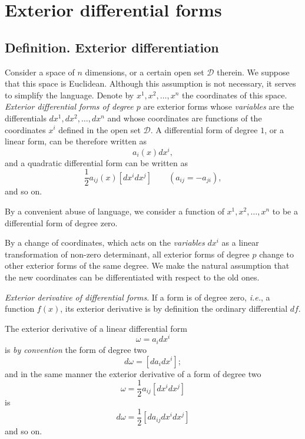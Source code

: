 \chapter{Exterior differential forms}
\label{cha:exter-diff-forms}

\section{Definition. Exterior differentiation}
\label{sec:defin-exter-diff}

\fsec Consider a space of $n$ dimensions, or a certain open set $\mathcal{D}$ therein. We suppose that this space is Euclidean. Although this assumption is not necessary, it serves  to simplify the language. Denote by $x^{1},x^{2},\dots,x^{n}$ the coordinates of this space.  \emph{Exterior differential forms of degree $p$}  are exterior forms whose \emph{variables} are the differentials $dx^{1},dx^{2},\dots,dx^{n}$ and whose coordinates are functions of the coordinates $x^{i}$ defined in the open set $\mathcal{D}$. A differential form of degree $1$, or a linear form, can be therefore written as
\[
a_{i}(x)dx^{i},
\]
and a quadratic differential form can be written as
\[
\frac{1}{2}a_{ij}(x)[dx^{i}dx^{j}]\qquad(a_{ij}=-a_{ji}),
\]
and so on.

By a convenient abuse of language, we consider a function of $x^{1},x^{2},\dots,x^{n}$ to be a differential form of degree zero.

By a change of coordinates, which acts on the \emph{variables} $dx^{i}$ as a linear transformation of non-zero determinant, all exterior forms of degree $p$ change to other exterior forms of the same degree. We make the natural assumption that the new coordinates can be differentiated with respect to the old ones.

\vspace{12pt}\fsec \emph{Exterior derivative of differential forms}. If a form is of degree zero, \emph{i.e.}, a function $f(x)$, its exterior derivative is by definition the ordinary differential $df$.

The exterior derivative of a linear differential form
\[
\omega=a_{i}dx^{i}
\]
is \emph{by convention} the form of degree two
\[
d\omega=[da_{i}dx^{i}];
\]
and in the same manner the exterior derivative of a form of degree two
\[
\omega=\frac{1}{2}a_{ij}[dx^{i}dx^{j}]
\]is
\[
d\omega=\frac{1}{2}[da_{ij}dx^{i}dx^{j}]
\]
and so on.

